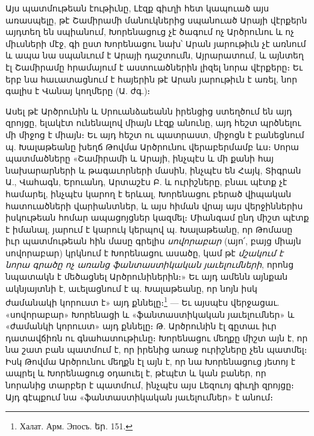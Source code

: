 \documentclass{article}
\begin{document}
{Այս պատմութեան էութիւնը, Լէզք գիւղի հետ կապուած այս առասպելը, թէ Շամիրամի մանուկներից սպանուած Արայի վէրքերն այդտեղ են սպիանում, Խորենացուց չէ ծագում ոչ Արծրունու և ոչ միւսների մէջ, գի ըստ Խորենացու նախ՝ Արան յարութիւն չէ առնում և ապա նա սպանւում է Արայի դաշտումն, Այրարատում, և այնտեղ էլ Շամիրամը հրամայում է աստուածներին լիզել նորա վէրքերը։ Եւ երբ նա հաւատացնում է հայերին թէ Արան յարութիւն է առել, նոր գալիս է Վանայ կողմերը (Ա. ժգ.)։

Ասել թէ Արծրունին և Սրուանձաեանն իրենցից ստեղծում են այդ զրոյցը, ելակէտ ունենալով միայն Լէզք անունը, այդ հեշտ պրծնելու մի միջոց է միայն։ Եւ այդ հեշտ ու պատրաստ, միջոցն է բանեցնում պ. Խալաթեանը խեղճ Թովմա Արծրունու վերաբերմամբ ևս։ Սորա պատմածները «Շամիրամի և Արայի, ինչպէս և մի քանի հայ նախարարների և թագաւորների մասին, ինչպէս են Հայկ, Տիգրան Ա., Վահագն, Երուանդ, Արտաշէս Բ. և ուրիշները, բնաւ պէտք չէ համարել, ինչպէս կարող է երևալ, Խորենացու բերած վիպական հատուածների վարիանտներ, և այս հիման վրայ այս վերջիններիս իսկութեան հոմար ապացոյցներ կազմել։ Միանգամ ընդ միշտ պէտք է իմանալ, յարում է կարուկ կերպով պ. Խալաթեանը, որ Թոմասը իւր պատմութեան հին մասը գրելիս \emph{սովորաբար} (այո՛, բայց միայն սովորաբար) կրկնում է Խորենացու ասածը, կամ թէ \emph{մշակում է նորա գրածը ոչ առանց ֆանտաստիկական յաւելումների}, որոնց նպատակն է մեծացնել Արծրունիներին։» Եւ այդ ամենն այնքան ակնյայտնի է, աւելացնում է պ. Խալաթեանը, որ նոյն իսկ ժամանակի կորուստ է» այդ քննելը։\footnote{Халат. Арм. Эпосъ. եր. 151.} — Եւ այսպէս վերջացաւ. «սովորաբար» Խորենացի և «ֆանտաստիկական յաւելումներ» և «ժամանկի կորուստ» այդ քննելը։ Թ. Արծրունին էլ գըտաւ իւր դատավճիռն ու գնահատութիւնը։ Խորենացու մեղքը միշտ այն է, որ նա շատ բան պատմում է, որ իրենից առաջ ուրիշները չեն պատմել։ Իսկ Թովմա Արծրունու մեղքն էլ այն է, որ նա Խորենացուց յետոյ է ապրել և Խորենացուց օդաուել է, թէպէտ և կան բաներ, որ նորանից տարբեր է պատմում, ինչպէս այս Լեզուոյ գիւղի զրոյցը։ Այդ գէպքում նա «ֆանտաստիկական յաւելումներ» է անում։

}
\end{document}
